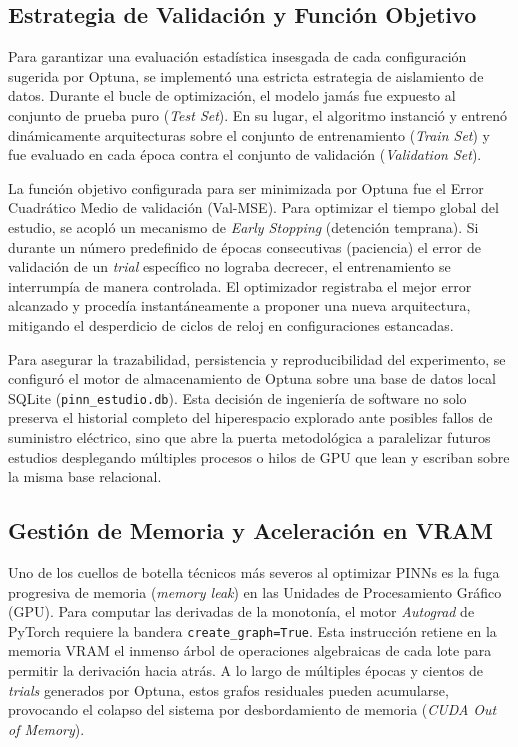 \documentclass[a4paper, 12pt, twocolumn]{book}
\begin{document}
\subsection{Estrategia de Validación y Función Objetivo}

Para garantizar una evaluación estadística insesgada de cada configuración sugerida por Optuna, se implementó una estricta estrategia de aislamiento de datos. Durante el bucle de optimización, el modelo jamás fue expuesto al conjunto de prueba puro (\textit{Test Set}). En su lugar, el algoritmo instanció y entrenó dinámicamente arquitecturas sobre el conjunto de entrenamiento (\textit{Train Set}) y fue evaluado en cada época contra el conjunto de validación (\textit{Validation Set}).

La función objetivo configurada para ser minimizada por Optuna fue el Error Cuadrático Medio de validación (Val-MSE). Para optimizar el tiempo global del estudio, se acopló un mecanismo de \textit{Early Stopping} (detención temprana). Si durante un número predefinido de épocas consecutivas (paciencia) el error de validación de un \textit{trial} específico no lograba decrecer, el entrenamiento se interrumpía de manera controlada. El optimizador registraba el mejor error alcanzado y procedía instantáneamente a proponer una nueva arquitectura, mitigando el desperdicio de ciclos de reloj en configuraciones estancadas.

Para asegurar la trazabilidad, persistencia y reproducibilidad del experimento, se configuró el motor de almacenamiento de Optuna sobre una base de datos local SQLite (\texttt{pinn\_estudio.db}). Esta decisión de ingeniería de software no solo preserva el historial completo del hiperespacio explorado ante posibles fallos de suministro eléctrico, sino que abre la puerta metodológica a paralelizar futuros estudios desplegando múltiples procesos o hilos de GPU que lean y escriban sobre la misma base relacional.

\subsection{Gestión de Memoria y Aceleración en VRAM}

Uno de los cuellos de botella técnicos más severos al optimizar PINNs es la fuga progresiva de memoria (\textit{memory leak}) en las Unidades de Procesamiento Gráfico (GPU). Para computar las derivadas de la monotonía, el motor \textit{Autograd} de PyTorch requiere la bandera \texttt{create\_graph=True}. Esta instrucción retiene en la memoria VRAM el inmenso árbol de operaciones algebraicas de cada lote para permitir la derivación hacia atrás. A lo largo de múltiples épocas y cientos de \textit{trials} generados por Optuna, estos grafos residuales pueden acumularse, provocando el colapso del sistema por desbordamiento de memoria (\textit{CUDA Out of Memory}).
\end{document}
